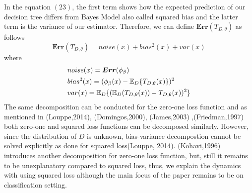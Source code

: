 In the equation $(23)$, the first term shows how the expected prediction of our decision tree differs from Bayes Model also called squared bias and the latter term is the variance of our estimator. Therefore, we can define $\boldsymbol{Err}(T_{D,\theta})$ as follows
\begin{equation}
\boldsymbol{Err}(T_{D,\theta}) = noise(x) + bias^2(x) + var(x)
\end{equation}
where
\begin{align}
& noise(x) = \boldsymbol{Err}(\phi_{\beta}) \notag \\
& bias^2(x) = (\phi_{\beta}(x) - \mathbb{E}_{D}\{T_{D,\theta}(x)\})^2 \notag \\
& var(x) = \mathbb{E}_{D}\{(\mathbb{E}_{D}(T_{D,\theta}(x)) - T_{D,\theta}(x))^2\} \notag
\end{align}
The same decomposition can be conducted for the zero-one loss function and as mentioned in (Louppe,2014), (Domingos,2000), (James,2003) ,(Friedman,1997) both zero-one and squared loss functions can be decomposed similarly. However, since the distribution of $D$ is unknown, bias-variance decompostion cannot be solved explicitly as done for squared loss(Louppe, 2014). (Kohavi,1996) introduces another decomposition for zero-one loss function, but, still it remains to be unexplanatory compared to squared loss, thus, we explain the dynamics with using squared loss although the main focus of the paper remains to be on classification setting.
